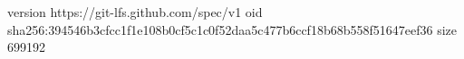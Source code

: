 version https://git-lfs.github.com/spec/v1
oid sha256:394546b3cfcc1f1e108b0cf5c1c0f52daa5c477b6ccf18b68b558f51647eef36
size 699192
